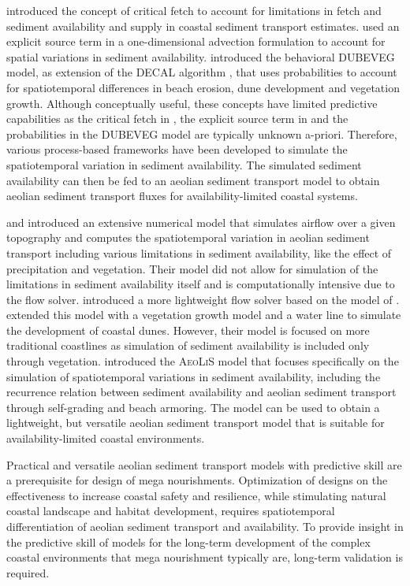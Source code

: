 \documentclass[preprint,12pt,authoryear]{elsarticle}
\begin{document}
\citet{Bauer2002} introduced the concept of critical fetch to account
for limitations in fetch and sediment availability and supply in
coastal sediment transport estimates. \citet{deVries2014b} used an
explicit source term in a one-dimensional advection formulation to
account for spatial variations in sediment
availability. \citet{Keijsers2016} introduced the behavioral DUBEVEG
model, as extension of the DECAL algorithm \citep{Baas2002}, that uses
probabilities to account for spatiotemporal differences in beach
erosion, dune development and vegetation growth. Although conceptually
useful, these concepts have limited predictive capabilities as the
critical fetch in \citet{Bauer2002}, the explicit source term in
\citet{deVries2014b} and the probabilities in the DUBEVEG model are
typically unknown a-priori. Therefore, various process-based
frameworks have been developed to simulate the spatiotemporal
variation in sediment availability. The simulated sediment
availability can then be fed to an aeolian sediment transport model to
obtain aeolian sediment transport fluxes for availability-limited
coastal systems.

\citet{vanDijk1999} and \citet{vanBoxtel1999} introduced an extensive
numerical model that simulates airflow over a given topography and
computes the spatiotemporal variation in aeolian sediment transport
including various limitations in sediment availability, like the
effect of precipitation and vegetation. Their model did not allow for
simulation of the limitations in sediment availability itself and is
computationally intensive due to the flow solver. \citet{Kroy2002}
introduced a more lightweight flow solver based on the model of
\citet{Weng1991}. \citet{Duran2013} extended this model with a
vegetation growth model and a water line to simulate the development
of coastal dunes. However, their model is focused on more traditional
coastlines as simulation of sediment availability is included only
through vegetation. \citet{Hoonhout2016} introduced the
\textsc{AeoLiS} model that focuses specifically on the simulation of
spatiotemporal variations in sediment availability, including the
recurrence relation between sediment availability and aeolian sediment
transport through self-grading and beach armoring. The model can be
used to obtain a lightweight, but versatile aeolian sediment transport
model that is suitable for availability-limited coastal environments.

Practical and versatile aeolian sediment transport models with
predictive skill are a prerequisite for design of mega
nourishments. Optimization of designs on the effectiveness to increase
coastal safety and resilience, while stimulating natural coastal
landscape and habitat development, requires spatiotemporal
differentiation of aeolian sediment transport and availability. To
provide insight in the predictive skill of models for the long-term
development of the complex coastal environments that mega nourishment
typically are, long-term validation is required.
\end{document}

